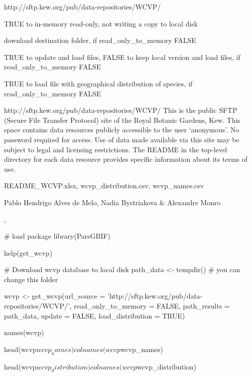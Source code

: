 \documentclass[a4paper]{book}
\begin{document}
%
\begin{Arguments}
\begin{ldescription}
\item[\code{url\_source}] http://sftp.kew.org/pub/data-repositories/WCVP/

\item[\code{read\_only\_to\_memory}] TRUE to in-memory read-only, not writing a copy to local disk

\item[\code{path\_results}] download destination folder, if read\_only\_to\_memory FALSE

\item[\code{update}] TRUE to update and load files, FALSE to keep local version and load files, if read\_only\_to\_memory FALSE

\item[\code{load\_distribution}] TRUE to load file with geographical distribution of species, if read\_only\_to\_memory FALSE
\end{ldescription}
\end{Arguments}
%
\begin{Details}
http://sftp.kew.org/pub/data-repositories/WCVP/ This is the public SFTP (Secure File Transfer Protocol) site of the Royal Botanic Gardens, Kew. This space contains data resources publicly accessible to the user `anonymous'.  No password required for access. Use of data made available via this site may be subject to legal and licensing restrictions. The README in the top-level directory for each data resource provides specific information about its terms of use.
\end{Details}
%
\begin{Value}
README\_WCVP.xlsx,
wcvp\_distribution.csv,
wcvp\_names.csv
\end{Value}
%
\begin{Author}
Pablo Hendrigo Alves de Melo,
Nadia Bystriakova \&
Alexandre Monro
\end{Author}
%
\begin{SeeAlso}
, 
\end{SeeAlso}
%
\begin{Examples}
\begin{ExampleCode}

# load package
library(ParsGBIF)

help(get_wcvp)

# Download wcvp database to local disk
path_data <- tempdir() # you can change this folder

wcvp <- get_wcvp(url_source = 'http://sftp.kew.org/pub/data-repositories/WCVP/',
                 read_only_to_memory = FALSE,
                 path_results = path_data,
                 update = FALSE,
                 load_distribution = TRUE)

names(wcvp)

head(wcvp$wcvp_names)
colnames(wcvp$wcvp_names)

head(wcvp$wcvp_distribution)
colnames(wcvp$wcvp_distribution)

\end{ExampleCode}
\end{Examples}
\end{document}
